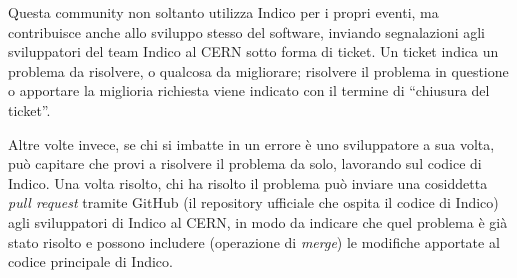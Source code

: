		Questa community non soltanto utilizza Indico per i propri eventi, ma contribuisce anche allo sviluppo stesso del software,  inviando segnalazioni agli sviluppatori del team Indico  al \ac{CERN} sotto forma di ticket. Un ticket indica un problema da risolvere, o qualcosa da migliorare; risolvere il problema in questione o apportare la miglioria richiesta viene indicato con il termine di ``chiusura del ticket''.
		
		Altre volte invece, se chi si imbatte in un errore è uno sviluppatore a sua volta, può capitare che provi a risolvere il problema da solo, lavorando sul codice di Indico. Una volta  risolto, chi ha risolto il problema può inviare una cosiddetta \textit{pull request} tramite GitHub (il repository ufficiale che ospita il codice di Indico) agli sviluppatori di Indico al \ac{CERN}, in modo da indicare che  quel  problema è già stato risolto e possono includere (operazione di \textit{merge}) le modifiche apportate al codice principale di Indico.
	